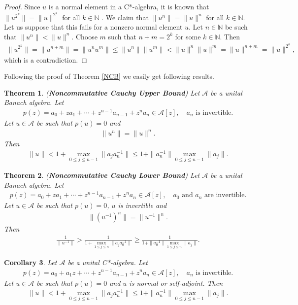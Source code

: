 \documentclass{amsart}
\newtheorem{theorem}{Theorem}[section]
\newtheorem{corollary}[theorem] {Corollary}
\begin{document}
\begin{proof}
	Since $u$ is a normal element in a C*-algebra, it is known that  $\|u^{2^k}\|=\|u\|^{2^k}$ for all  $k \in \mathbb{N}$ \cite{TAKESAKI}. We claim that $	\|u^n\|=\|u\|^n$ for all  $k \in \mathbb{N}.$ Let us suppose that this fails for a nonzero normal element $u$. Let $n \in \mathbb{N}$ be such that $	\|u^n\|<\|u\|^n$. Choose $m$ such that $n+m=2^k$ for some $k \in \mathbb{N}$. Then 
	\begin{align*}
		\|u^{2^k}\|=\|u^{n+m}\|=\|u^nu^m\|\leq \|u^n\|\|u^m\|<\|u\|^n\|u\|^m=\|u\|^{n+m}=\|u\|^{2^k},
	\end{align*}
which is a contradiction. 
\end{proof}
Following the proof of Theorem \ref{NCB} we easily get following results. 
\begin{theorem}
(\textbf{Noncommutative Cauchy Upper Bound}) Let $\mathcal{A}$ be a unital Banach algebra. Let 
\begin{align*}
	p(z)=a_0+za_1+\cdots+z^{n-1}a_{n-1}+z^na_n\in \mathcal{A}[z], \quad a_n \text{ is invertible}.
\end{align*}
Let $u \in \mathcal{A}$ be such that $p(u)=0$ and 
\begin{align*}
	\|u^n\|=\|u\|^n.
\end{align*}
Then 
\begin{align*}
	\|u\|< 1+\max_{0\leq j \leq n-1}\|a_ja_n^{-1}\|\leq 1+\|a^{-1}_n\|\max_{0\leq j \leq n-1}\|a_j\|.
\end{align*}		
\end{theorem}
\begin{theorem}
(\textbf{Noncommutative Cauchy Lower Bound}) Let $\mathcal{A}$ be a unital Banach algebra. Let 
\begin{align*}
	p(z)=a_0+za_1+\cdots+z^{n-1}a_{n-1}+z^na_n\in \mathcal{A}[z], \quad a_0 \text{ and } a_n \text{ are invertible}.
\end{align*}
Let $u \in \mathcal{A}$ be such that $p(u)=0$, $u$ is invertible and 
\begin{align*}
	\|(u^{-1})^n\|=\|u^{-1}\|^n.
\end{align*}
Then 
\begin{align*}
	\frac{1}{\|u^{-1}\|}>\frac{1}{	1+\max_{1\leq j \leq n}\|a_ja_0^{-1}\|}\geq \frac{1}{1+\|a^{-1}_0\|\max_{1\leq j \leq n}\|a_j\|}.
\end{align*}			
\end{theorem}
\begin{corollary}
	Let $\mathcal{A}$ be a unital C*-algebra. Let 
	\begin{align*}
		p(z)=a_0+a_1z+\cdots+z^{n-1}a_{n-1}+z^na_n\in \mathcal{A}[z], \quad a_n \text{ is invertible}.
	\end{align*}
	Let $u \in \mathcal{A}$ be such that $p(u)=0$ and $u$ is normal or self-adjoint.
	Then 
	\begin{align*}
		\|u\|< 1+\max_{0\leq j \leq n-1}\|a_ja_n^{-1}\|\leq 1+\|a_n^{-1}\|\max_{0\leq j \leq n-1}\|a_j\|.
	\end{align*}
\end{corollary}
\end{document}

